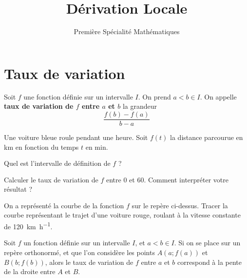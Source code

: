 \documentclass{poly}
\title{Dérivation Locale}
\author{Première Spécialité Mathématiques}
\date{}
\begin{document}
\maketitle
\section{Taux de variation}
\begin{definition}
Soit $f$ une fonction définie sur un intervalle $I$. On prend $a < b \in I$. On appelle \textbf{taux de variation de $f$ entre $a$ et $b$} la grandeur
\begin{equation*}
\dfrac{f(b)-f(a)}{b-a}
\end{equation*}
\end{definition}
\begin{example}
Une voiture bleue roule pendant une heure. Soit $f(t)$ la distance parcourue en \unit{\kilo\meter} en fonction du temps $t$ en \unit{\minute}.
\begin{alphaquestions}
\item Quel est l'intervalle de définition de $f$ ?
\item Calculer le taux de variation de $f$ entre $0$ et $60$. Comment interpréter votre résultat ?
\begin{center}
\end{center}
\vspace*{0.2cm}

\item On a représenté la courbe de la fonction $f$ sur le repère ci-dessus. Tracer la courbe représentant le trajet d'une voiture rouge, roulant à la vitesse constante de \qty{120}{\kilo\meter\per\hour}.
\end{alphaquestions}
\end{example}
\newpage
\begin{proposition}
Soit $f$ un fonction définie sur un intervalle $I$, et $a < b \in I$. Si on se place sur un repère orthonormé, et que l'on considère les points $A(a;f(a))$ et $B(b;f(b))$, alors le taux de variation de $f$ entre $a$ et $b$ correspond à la pente de la droite entre $A$ et $B$. 
\end{proposition}
\end{document}
